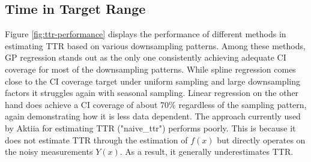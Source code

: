 \subsection{Time in Target Range}\label{subsec:time-in-target-range}

Figure \ref{fig:ttr-performance} displays the performance of different methods
in estimating TTR based on various downsampling patterns.
Among these methods, GP regression stands out as the only one consistently achieving
adequate CI coverage for most of the downsampling patterns.
While spline regression comes close to the CI coverage target
under uniform sampling and large downsampling factors it struggles again
with seasonal sampling. Linear regression on the other hand
does achieve a CI coverage of about 70\% regardless of the sampling pattern,
again demonstrating how it is less data dependent.
The approach currently used by Aktiia for estimating TTR ("naive\_ttr")
performs poorly.
This is because it does not estimate TTR through the estimation of $f(x)$ but directly
operates on the noisy measurements $Y(x)$.
As a result, it generally underestimates TTR.


